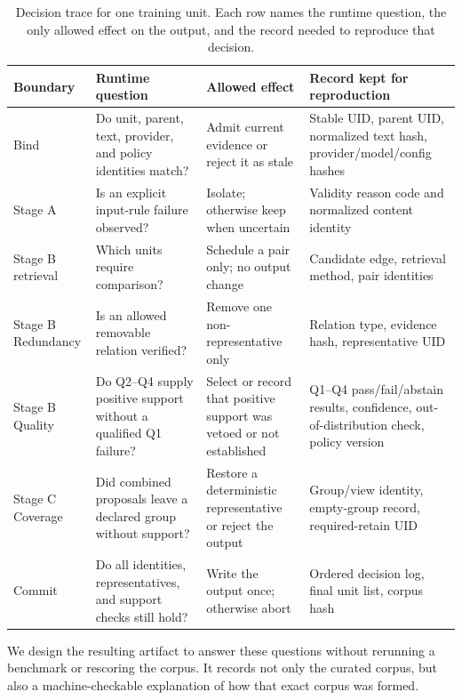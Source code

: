 \documentclass[conference]{IEEEtran}
\begin{document}
\begin{table}[!t]
\caption{Decision trace for one training unit. Each row names the runtime
question, the only allowed effect on the output, and the record needed to
reproduce that decision.}
\label{tab:unit-trace}
\centering
\footnotesize
\renewcommand{\arraystretch}{1.08}
\setlength{\tabcolsep}{3.5pt}
\begin{tabular}{@{}L{0.10\textwidth}L{0.27\textwidth}L{0.22\textwidth}L{0.31\textwidth}@{}}
\toprule
Boundary & Runtime question & Allowed effect & Record kept for reproduction \\
\midrule
Bind & Do unit, parent, text, provider, and policy identities match? & Admit current evidence or reject it as stale & Stable UID, parent UID, normalized text hash, provider/model/config hashes \\
Stage A & Is an explicit input-rule failure observed? & Isolate; otherwise keep when uncertain & Validity reason code and normalized content identity \\
Stage B retrieval & Which units require comparison? & Schedule a pair only; no output change & Candidate edge, retrieval method, pair identities \\
Stage B Redundancy & Is an allowed removable relation verified? & Remove one non-representative only & Relation type, evidence hash, representative UID \\
Stage B Quality & Do Q2--Q4 supply positive support without a qualified Q1 failure? & Select or record that positive support was vetoed or not established & Q1--Q4 pass/fail/abstain results, confidence, out-of-distribution check, policy version \\
Stage C Coverage & Did combined proposals leave a declared group without support? & Restore a deterministic representative or reject the output & Group/view identity, empty-group record, required-retain UID \\
Commit & Do all identities, representatives, and support checks still hold? & Write the output once; otherwise abort & Ordered decision log, final unit list, corpus hash \\
\bottomrule
\end{tabular}
\end{table}

We design the resulting artifact to answer these questions without rerunning a
benchmark or rescoring the corpus. It records not only the curated corpus, but also a
machine-checkable explanation of how that exact corpus was formed.
\end{document}

